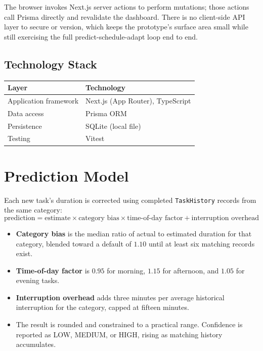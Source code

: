 \documentclass[11pt,a4paper]{article}
\begin{document}
The browser invokes Next.js server actions to perform mutations; those actions call Prisma directly and
revalidate the dashboard. There is no client-side API layer to secure or version, which keeps the
prototype's surface area small while still exercising the full predict-schedule-adapt loop end to end.

\subsection{Technology Stack}
\begin{center}
\begin{tabular}{ll}
\toprule
\textbf{Layer} & \textbf{Technology} \\
\midrule
Application framework & Next.js (App Router), TypeScript \\
Data access & Prisma ORM \\
Persistence & SQLite (local file) \\
Testing & Vitest \\
\bottomrule
\end{tabular}
\end{center}

\section{Prediction Model}
Each new task's duration is corrected using completed \texttt{TaskHistory} records from the same
category:
\begin{equation}
\text{prediction} = \text{estimate} \times \text{category bias} \times \text{time-of-day factor} +
\text{interruption overhead}
\end{equation}

\begin{itemize}
    \item \textbf{Category bias} is the median ratio of actual to estimated duration for that category,
    blended toward a default of $1.10$ until at least six matching records exist.
    \item \textbf{Time-of-day factor} is $0.95$ for morning, $1.15$ for afternoon, and $1.05$ for
    evening tasks.
    \item \textbf{Interruption overhead} adds three minutes per average historical interruption for the
    category, capped at fifteen minutes.
    \item The result is rounded and constrained to a practical range. Confidence is reported as LOW,
    MEDIUM, or HIGH, rising as matching history accumulates.
\end{itemize}
\end{document}

